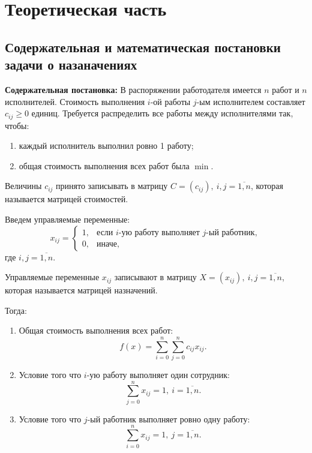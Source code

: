 \chapter{Теоретическая часть}
\section{Содержательная и математическая постановки задачи о назаначениях}

\textbf{Содержательная постановка:} В распоряжении работодателя имеется $n$ работ и $n$ исполнителей. Стоимость выполнения $i\text{-ой}$ работы $j\text{-ым}$ исполнителем составляет $c_{ij} \geqslant 0$ единиц. Требуется распределить все работы между исполнителями так, чтобы:

\begin{enumerate}[label=\arabic*)]
    \item каждый исполнитель выполнил ровно 1 работу;
    \item общая стоимость выполнения всех работ была $\min$.
\end{enumerate}

Величины $c_{ij}$ принято записывать в матрицу $C = (c_{ij}),\ i,j = \overline{1{,}n}$, которая называется матрицей стоимостей.

Введем управляемые переменные:
$$
    x_{ij} =
    \begin{cases}
        1, & \text{если $i$-ую работу выполняет $j$-ый работник}, \\
        0, & \text{иначе},
    \end{cases}
$$
где $i, j = \overline{1{,}n}$.

Управляемые переменные $x_{ij}$ записывают в матрицу $X = (x_{ij}),\ i,j = \overline{1{,}n}$, которая называется матрицей назначений. 

Тогда:
\begin{enumerate}[label=\arabic*)]
    \item Общая стоимость выполнения всех работ:
    $$
        f(x) = \sum\limits_{i=0}^n\sum\limits_{j=0}^nc_{ij}x_{ij}.
    $$
    \item Условие того что $\text{$i$-ую}$ работу выполняет один сотрудник:
    $$
        \sum\limits_{j=0}^nx_{ij} = 1,\ i = \overline{1{,}n}.
    $$
    \item Условие того что $\text{$j$-ый}$ работник выполняет ровно одну работу:
    $$
        \sum\limits_{i=0}^nx_{ij} = 1,\ j = \overline{1{,}n}.
    $$
\end{enumerate}

